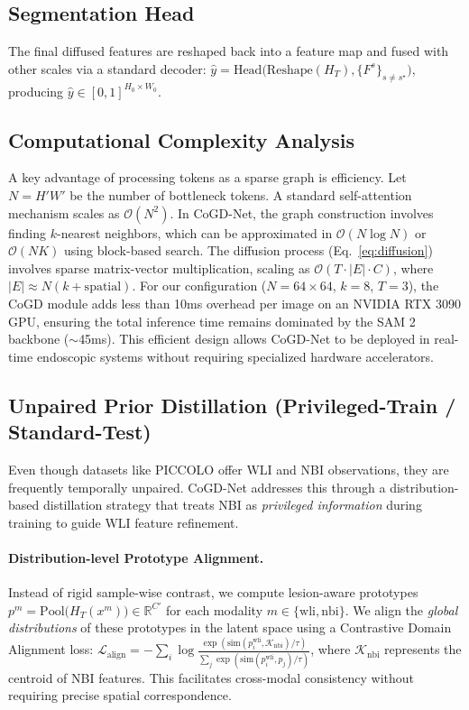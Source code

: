 \documentclass{article}
\begin{document}
\subsection{Segmentation Head}
The final diffused features are reshaped back into a feature map and fused with other scales via a standard decoder:
$\hat{y} = \mathrm{Head}\Big(\mathrm{Reshape}(H_{T}),\{F^{s}\}_{s\neq s^\star}\Big)$, producing $\hat{y}\in[0,1]^{H_0\times W_0}$.

\subsection{Computational Complexity Analysis}
A key advantage of processing tokens as a sparse graph is efficiency. Let $N=H'W'$ be the number of bottleneck tokens. A standard self-attention mechanism scales as $\mathcal{O}(N^2)$.
In CoGD-Net, the graph construction involves finding $k$-nearest neighbors, which can be approximated in $\mathcal{O}(N \log N)$ or $\mathcal{O}(NK)$ using block-based search. The diffusion process (Eq.~\ref{eq:diffusion}) involves sparse matrix-vector multiplication, scaling as $\mathcal{O}(T \cdot |E| \cdot C)$, where $|E| \approx N(k + \text{spatial})$.
For our configuration ($N=64\times64$, $k=8$, $T=3$), the CoGD module adds less than 10ms overhead per image on an NVIDIA RTX 3090 GPU, ensuring the total inference time remains dominated by the SAM 2 backbone ($\sim$45ms). This efficient design allows CoGD-Net to be deployed in real-time endoscopic systems without requiring specialized hardware accelerators.

\subsection{Unpaired Prior Distillation (Privileged-Train / Standard-Test)}
Even though datasets like PICCOLO \cite{SanchezPeralta2020PICCOLO} offer WLI and NBI observations, they are frequently temporally unpaired. CoGD-Net addresses this through a distribution-based distillation strategy that treats NBI as \emph{privileged information} during training to guide WLI feature refinement.

\paragraph{Distribution-level Prototype Alignment.}
Instead of rigid sample-wise contrast, we compute lesion-aware prototypes $p^{m} = \mathrm{Pool}\big(H_{T}(x^{m})\big)\in\mathbb{R}^{C'}$ for each modality $m\in\{\text{wli},\text{nbi}\}$. We align the \emph{global distributions} of these prototypes in the latent space using a Contrastive Domain Alignment loss:
$\mathcal{L}_{\mathrm{align}} = -\sum_{i} \log \frac{\exp(\mathrm{sim}(p_i^{\mathrm{wli}}, \mathcal{K}_{\mathrm{nbi}})/\tau)} {\sum_{j} \exp(\mathrm{sim}(p_i^{\mathrm{wli}}, p_j)/\tau)}$, where $\mathcal{K}_{\mathrm{nbi}}$ represents the centroid of NBI features. This facilitates cross-modal consistency without requiring precise spatial correspondence.
\end{document}
